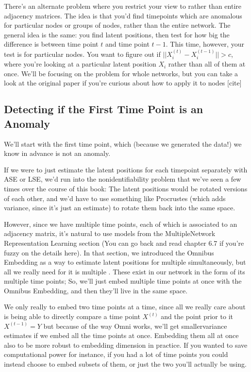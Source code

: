 \documentclass[letterpaper,10pt,english]{jupyterBook}
\begin{document}
\sphinxAtStartPar
There’s an alternate problem where you restrict your view to  rather than entire adjacency matrices. The idea is that you’d find time\sphinxhyphen{}points which are anomalous for particular nodes or groups of nodes, rather than the entire network. The general idea is the same: you find latent positions, then test for how big the difference is between time point \(t\) and time point \(t-1\). This time, however, your test is for particular nodes. You want to figure out if \(||X_i^{(t)} - X_i^{(t-1)}|| > c\), where you’re looking at a particular latent position \(X_i\) rather than all of them at once. We’ll be focusing on the problem for whole networks, but you can take a look at the original paper if you’re curious about how to apply it to nodes {[}cite{]}


\subsection{Detecting if the First Time Point is an Anomaly}
\label{\detokenize{applications/ch10/anomaly-detection:detecting-if-the-first-time-point-is-an-anomaly}}
\sphinxAtStartPar
We’ll start with the first time point, which (because we generated the data!) we know in advance is not an anomaly.

\sphinxAtStartPar
If we were to just estimate the latent positions for each timepoint separately with ASE or LSE, we’d run into the nonidentifiability problem that we’ve seen a few times over the course of this book: The latent positions would be rotated versions of each other, and we’d have to use something like Procrustes (which adds variance, since it’s just an estimate) to rotate them back into the same space.

\sphinxAtStartPar
However, since we have multiple time points, each of which is associated to an adjacency matrix, it’s natural to use models from the Multiple\sphinxhyphen{}Network Representation Learning section (You can go back and read chapter 6.7 if you’re fuzzy on the details here). In that section, we introduced the Omnibus Embedding as a way to estimate latent positions for multiple  simultaneously, but all we really need for it is multiple . These exist in our network in the form of its multiple time points; So, we’ll just embed multiple time points at once with the Omnibus Embedding, and then they’ll live in the same space.

\sphinxAtStartPar
We only really  to embed two time points at a time, since all we really care about is being able to directly compare a time point \(X^{(t)}\) and the point prior to it \(X^{(t-1)} = Y\) \sphinxhyphen{} but because of the way Omni works, we’ll get smaller\sphinxhyphen{}variance estimates if we embed all the time points at once. Embedding them all at once also to be more robust to embedding dimension in practice. If you wanted to save computational power \sphinxhyphen{} for instance, if you had a lot of time points \sphinxhyphen{} you could instead choose to embed subsets of them, or just the two you’ll actually be using.
\end{document}

